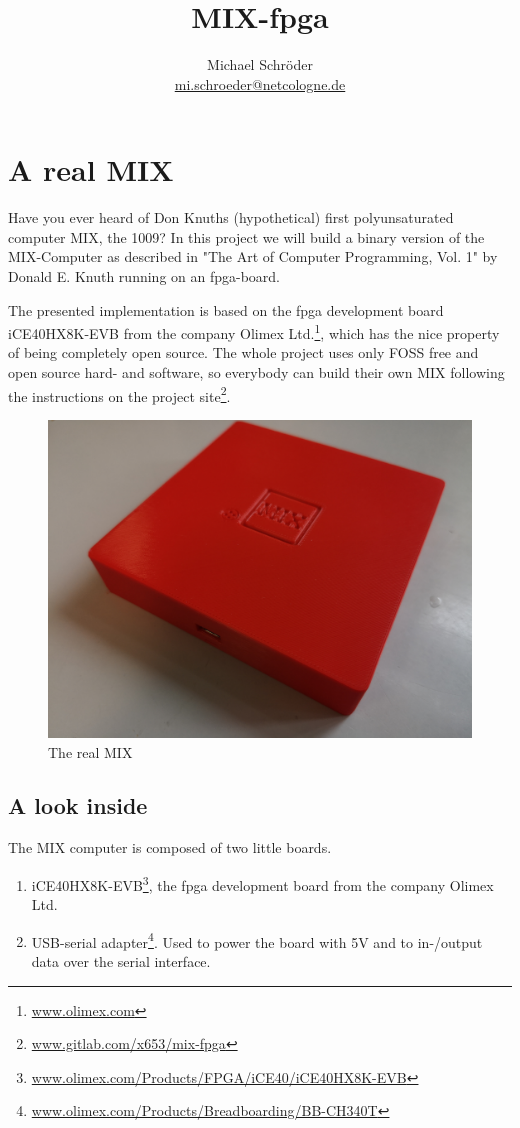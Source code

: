 \documentclass[a4paper,ngerman]{scrartcl}
\title{MIX-fpga}
\author{Michael Schröder \\ \href{mi.schroeder@netcologne.de}{mi.schroeder@netcologne.de}}
\begin{document}
\maketitle

\section{A real MIX}

Have you ever heard of Don Knuths (hypothetical) first polyunsaturated computer MIX, the 1009? In this project we will build a binary version of the MIX-Computer as described in "The Art of Computer Programming, Vol. 1" by Donald E. Knuth running on an fpga-board.

The presented implementation is based on the fpga development board iCE40HX8K-EVB from the company Olimex Ltd.\footnote{\href{www.olimex.com}{www.olimex.com}}, which has the nice property of being completely open source. The whole project uses only FOSS free and open source hard- and software, so everybody can build their own MIX following the instructions on the project site\footnote{\href{www.gitlab.com/x653/mix-fpga}{www.gitlab.com/x653/mix-fpga}}.

\begin{figure}[H]
	\centering
	\includegraphics[width=0.6\linewidth]{../MIX_real.jpg}
	\caption{The real MIX}
	\label{fig:mixtoast}
\end{figure}

\subsection{A look inside}

The MIX computer is composed of two little boards.

\begin{enumerate}
	\item iCE40HX8K-EVB\footnote{\href{www.olimex.com/Products/FPGA/iCE40/iCE40HX8K-EVB}{www.olimex.com/Products/FPGA/iCE40/iCE40HX8K-EVB}}, the fpga development board from the company Olimex Ltd.	
	\item  USB-serial adapter\footnote{\href{www.olimex.com/Products/Breadboarding/BB-CH340T}{www.olimex.com/Products/Breadboarding/BB-CH340T}}. Used to power the board with 5V and to in-/output data over the serial interface.
\end{enumerate}
\end{document}
